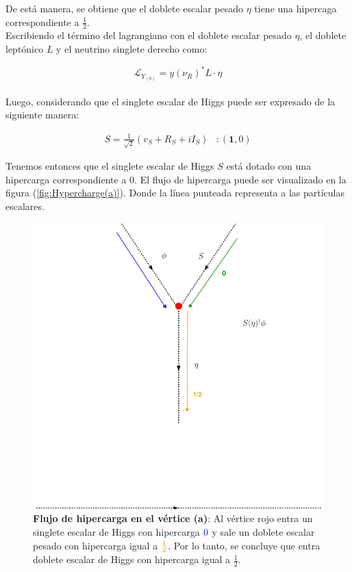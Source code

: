 \documentclass[12pt]{article}
\begin{document}
De está manera, se obtiene que el doblete escalar pesado $\eta$ tiene una hipercaga correspondiente a $\frac{1}{2}$. \\

 Escribiendo el término del lagrangiano con el doblete escalar pesado $\eta$, el doblete leptónico $L$ y el neutrino singlete derecho como:

\begin{equation}
    \label{eq:LaYukawa(a)}
     \mathcal{L}_{Y_{(b)}} =  y (\nu_R)^*{L}\cdot\eta
\end{equation} \\

Luego, considerando que el singlete escalar de Higgs puede ser expresado de la siguiente manera:

\begin{equation}
\begin{aligned}
 \label{eq:SingleTe1}
    S=\frac{1}{\sqrt{2}}(v_S+ R_S+iI_S) & : (\textbf{1}, 0) 
\end{aligned}
\end{equation}

Tenemos entonces que el singlete escalar de Higgs $S$ está dotado con una hipercarga correspondiente a $0$. El flujo de hipercarga puede ser visualizado en la figura (\ref{fig:Hypercharge(a)}). Donde la línea punteada representa a las partículas escalares. \\


\begin{figure}[h!]
  \begin{center}
  \includegraphics[scale=0.5]{Flujodriagram(b).pdf}
\caption{{\textbf{Flujo de hipercarga en el vértice (a)}: Al vértice rojo entra un singlete escalar de Higgs  con hipercarga  $\color{blue} 
0$ y sale un doblete escalar pesado con hipercarga igual a $\color{orange} \frac{1}{2}$. Por lo tanto, se concluye que entra  doblete escalar de Higgs con hipercarga igual a $ \frac{1}{2}$.}}
\label{fig:Hypercharge(b)}
\end{center}
\end{figure}
\end{document}

